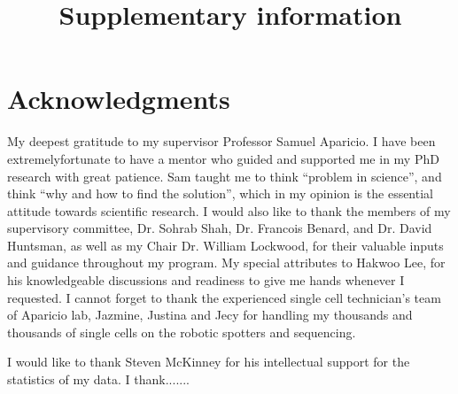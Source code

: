 

\makeatletter
\newcommand{\putFigLargCap}[5]
{
\begin{center}
\texttt{[image: \#1]}   
\bigskip
\setbox0\vbox{
\let\caption@rule\relax
\captionof{figure}[#5]{\textbf{#5} #3 \label{#4}}
\global\skip1\lastskip\unskip
\global\setbox1\lastbox

}
\unvbox0
\setbox0\hbox{\unhbox1\unskip\unskip\unpenalty
\global\setbox1\lastbox}
\unvbox1
\vskip\skip1
\end{center}
}
\makeatother





\title{Supplementary information}















\chapter{Acknowledgments}

My deepest gratitude to my supervisor Professor Samuel Aparicio. I have been extremelyfortunate to have a mentor who guided and supported me in my PhD research with great patience. Sam taught me to think “problem in science”, and think “why and how to find the solution”, which in my opinion is the essential attitude towards scientific research. I would also like to thank the members of my supervisory committee, Dr. Sohrab Shah, Dr. Francois Benard, and Dr. David Huntsman, as well as my Chair Dr. William Lockwood, for their valuable inputs and guidance throughout my program. My special attributes to Hakwoo Lee, for his knowledgeable discussions and  readiness to give me hands whenever I requested. I cannot forget to thank the experienced single cell technician's team of Aparicio lab, Jazmine, Justina and Jecy for handling my thousands and thousands of single cells on the robotic spotters and sequencing. 

I would like to thank Steven McKinney for his intellectual support for the statistics of my data. I thank.......

